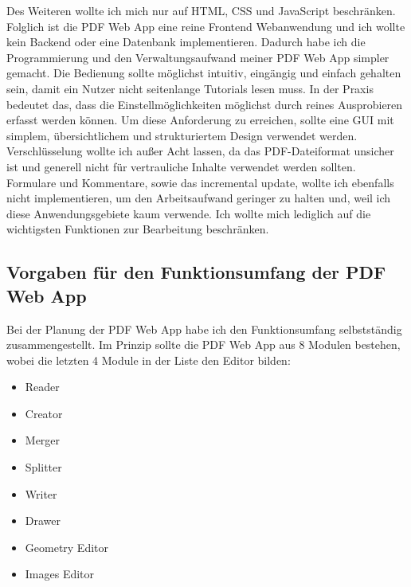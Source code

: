 Des Weiteren wollte ich mich nur auf HTML, CSS und JavaScript beschränken. Folglich ist die PDF Web App eine reine Frontend Webanwendung und ich wollte kein Backend oder eine Datenbank implementieren. Dadurch habe ich die Programmierung und den Verwaltungsaufwand meiner PDF Web App simpler gemacht. Die Bedienung sollte möglichst intuitiv, eingängig und einfach gehalten sein, damit ein Nutzer nicht seitenlange Tutorials lesen muss. In der Praxis bedeutet das, dass die Einstellmöglichkeiten möglichst durch reines Ausprobieren erfasst werden können. Um diese Anforderung zu erreichen, sollte eine GUI mit simplem, übersichtlichem und strukturiertem Design verwendet werden. Verschlüsselung wollte ich außer Acht lassen, da das PDF-Dateiformat unsicher ist und generell nicht für vertrauliche Inhalte verwendet werden sollten. Formulare und Kommentare, sowie das incremental update, wollte ich ebenfalls nicht implementieren, um den Arbeitsaufwand geringer zu halten und, weil ich diese Anwendungsgebiete kaum verwende. Ich wollte mich lediglich auf die wichtigsten Funktionen zur Bearbeitung beschränken.

\subsection{Vorgaben für den Funktionsumfang der PDF Web App}
Bei der Planung der PDF Web App habe ich den Funktionsumfang selbstständig zusammengestellt. Im Prinzip sollte die PDF Web App aus 8 Modulen bestehen, wobei die letzten 4 Module in der Liste den Editor bilden:

\begin{itemize}
	\item Reader
	\item Creator
	\item Merger
	\item Splitter
	\item Writer
	\item Drawer
	\item Geometry Editor
	\item Images Editor
\end{itemize}

